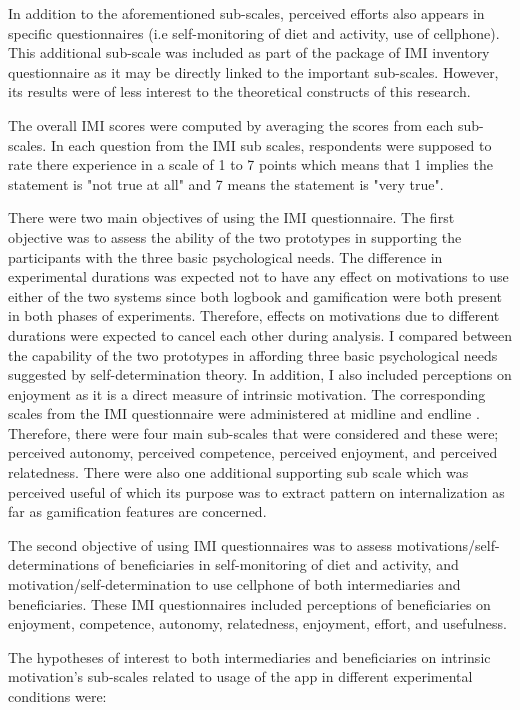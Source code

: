 In addition to the aforementioned sub-scales, perceived efforts also appears in specific questionnaires (i.e self-monitoring of diet and activity, use of cellphone). This additional sub-scale was included as part of the package of IMI inventory questionnaire as it may be directly linked to the important sub-scales. However, its results were of less interest to the theoretical constructs of this research.
  
The overall IMI scores were computed by averaging the scores from each sub-scales. In each question from the IMI sub scales, respondents were supposed to rate there experience in a scale of 1 to 7 points which means that 1 implies the statement is "not true at all" and 7 means the statement is "very true".

There were two main objectives of using the IMI questionnaire. The first objective was to assess the ability of the two prototypes in supporting the participants with the three basic psychological needs. The difference in experimental durations was expected not to have any effect on motivations to use either of the two systems since both logbook and gamification were both present in both phases of experiments. Therefore, effects on motivations due to different durations were expected to cancel each other during analysis. I compared between the capability of the two prototypes in affording three basic psychological needs suggested by self-determination theory. In addition, I also included perceptions on enjoyment as it is a direct measure of intrinsic motivation. The corresponding scales from the IMI questionnaire were administered at midline and endline . Therefore, there were four main sub-scales that were considered and these were; perceived autonomy, perceived competence, perceived enjoyment, and perceived relatedness. There were also one additional supporting sub scale which was perceived useful of which its purpose was to extract pattern on internalization as far as gamification features are concerned.

The second objective of using IMI questionnaires was to assess motivations/self-determinations of beneficiaries in self-monitoring of diet and activity, and motivation/self-determination to use cellphone of both intermediaries and beneficiaries. These IMI questionnaires included perceptions of beneficiaries on enjoyment, competence, autonomy, relatedness, enjoyment, effort, and usefulness.

The hypotheses of interest to both intermediaries and beneficiaries on intrinsic motivation's sub-scales related to usage of the app in different experimental conditions were:

